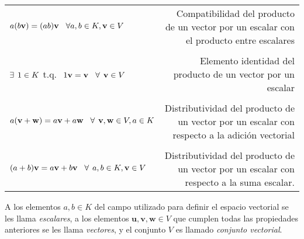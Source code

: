\documentclass[apuntes]{subfiles}
\begin{document}
\begin{tcolorbox}[breakable]
\begin{center}
\begin{tabular}{lr}
    \multirow{2}{0.35\textwidth}{$a(b\mathbf{v})=(ab)\mathbf{v}\hspace{3mm}\forall a,b\in K, \mathbf{v}\in V$} & \multirow{2}{0.47\textwidth}{Compatibilidad del producto de un vector por un escalar con el producto entre escalares} \\ \\ \\
    \multirow{2}{0.4\textwidth}{$\exists\hspace{1.5mm}1\in K$ \hspace{1.5mm} t.q. $\hspace{1.5mm}1\mathbf{v}=\mathbf{v}\hspace{3mm}\forall\hspace{1.5mm} \mathbf{v}\in V$} & \multirow{2}{0.35\textwidth}{Elemento identidad del producto de un vector por un escalar} \\ \\ \\
    \multirow{2}{0.4\textwidth}{$a(\mathbf{v}+\mathbf{w})=a\mathbf{v}+a\mathbf{w}\hspace{3mm}\forall\hspace{1.5mm} \mathbf{v},\mathbf{w}\in V, a\in K$} & \multirow{2}{0.47\textwidth}{Distributividad del producto de un vector por un escalar con respecto a la adición vectorial}  \\ \\ \\
    \multirow{2}{0.4\textwidth}{$(a+b)\mathbf{v}=a\mathbf{v}+b\mathbf{v}\hspace{3mm}\forall\hspace{1.5mm} a,b\in K, \mathbf{v}\in V$} & \multirow{2}{0.47\textwidth}{Distributividad del producto de un vector por un escalar con respecto a la suma escalar.} \\ \\
\end{tabular}
\end{center}

A los elementos $a,b \in K$ del campo utilizado para definir el espacio vectorial se les llama \emph{escalares}, a los elementos $\mathbf{u},\mathbf{v},\mathbf{w}\in V$ que cumplen todas las propiedades anteriores se les llama \emph{vectores}, y el conjunto $V$ es llamado \emph{conjunto vectorial}.

\end{tcolorbox}
\end{document}
